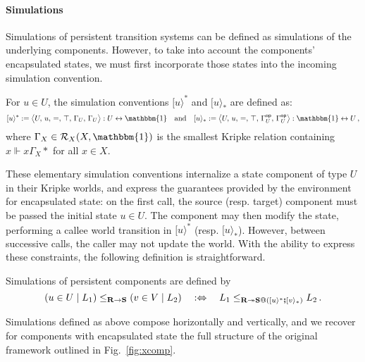 \documentclass[acmsmall,screen,review,anonymous]{acmart}
\newcommand{\kw}[1]{\ensuremath{ \mathsf{#1} }}
\newcommand{\vcomp}{\fatsemi}
\begin{document}
\paragraph{Simulations} %

Simulations of persistent transition systems
can be defined as simulations of the underlying components.
However,
to take into account the components' encapsulated states,
we must first incorporate those states into
the incoming simulation convention.

\begin{definition}
For $u \in U$,
the simulation conventions
$[ u \rangle^*$ and
$[ u \rangle_*$ are defined as:
\[
  [ u \rangle^* :=
    \big\langle U,\, u,\, {=},\, \top,\, \Gamma_U,\, \Gamma_U \big\rangle
    : U \leftrightarrow \mathbbm{1}
  \quad \text{and} \quad
  [ u \rangle_* :=
    \big\langle U,\, u,\, {=},\, \top,\, \Gamma_U^\kw{op},\, \Gamma_U^\kw{op} \big\rangle
    : \mathbbm{1} \leftrightarrow U
  \,,
\]
where $\Gamma_X \in \mathcal{R}_X(X, \mathbbm{1})$
is the smallest Kripke relation containing $x \Vdash x \mathrel{\Gamma_X} *$ for all $x \in X$.
\end{definition}

These elementary simulation conventions
internalize a state component of type $U$ in their Kripke worlds,
and express the guarantees provided by the environment
for encapsulated state:
on the first call, the source (resp. target) component
must be passed the initial state $u \in U$.
The component may then modify the state,
performing a callee world transition
in $[ u \rangle^*$ (resp. $[ u \rangle_*$).
However,
between successive calls,
the caller may not update the world.
With the ability to express these constraints,
the following definition is straightforward.

\begin{definition} \label{def:ssim} %
Simulations of persistent components are defined by
\[
  (u \in U \mid L_1)
  \le_{\mathbf{R} \rightarrow \mathbf{S}}
  (v \in V \mid L_2)
  \quad:\Leftrightarrow\quad
  L_1
  \le_{\mathbf{R} \twoheadrightarrow
       \mathbf{S} \mathbin@ ([ u \rangle^* \vcomp [ v \rangle_*)}
  L_2
  \,.
\]
\end{definition}

Simulations defined as above compose horizontally and vertically,
and we recover for components with encapsulated state
the full structure of the original framework
outlined in Fig.~\ref{fig:xcomp}.

\end{document}
